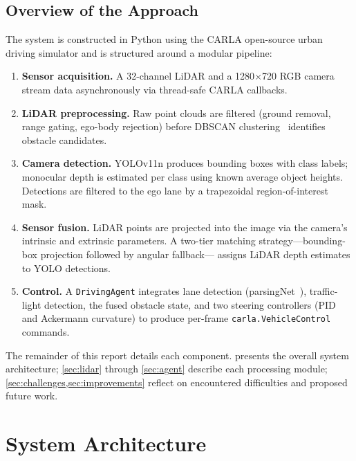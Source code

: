 \documentclass[12pt,a4paper]{article}
\begin{document}
\subsection{Overview of the Approach}

The system is constructed in Python using the CARLA open-source urban driving
simulator and is structured around a modular pipeline:
\begin{enumerate}[label=\textbf{\arabic*.}, leftmargin=2em]
  \item \textbf{Sensor acquisition.} A 32-channel LiDAR and a 1280$\times$720
        RGB camera stream data asynchronously via thread-safe CARLA callbacks.
  \item \textbf{LiDAR preprocessing.} Raw point clouds are filtered (ground
        removal, range gating, ego-body rejection) before DBSCAN
        clustering~\cite{ester1996dbscan} identifies obstacle candidates.
  \item \textbf{Camera detection.} YOLOv11n produces bounding boxes with class
        labels; monocular depth is estimated per class using known average
        object heights.  Detections are filtered to the ego lane by a
        trapezoidal region-of-interest mask.
  \item \textbf{Sensor fusion.} LiDAR points are projected into the image via
        the camera's intrinsic and extrinsic parameters.  A two-tier matching
        strategy---bounding-box projection followed by angular fallback---
        assigns LiDAR depth estimates to YOLO detections.
  \item \textbf{Control.} A \texttt{DrivingAgent} integrates lane detection
        (parsingNet~\cite{qin2020ufld}), traffic-light detection, the fused
        obstacle state, and two steering controllers (PID and Ackermann
        curvature) to produce per-frame \texttt{carla.VehicleControl} commands.
\end{enumerate}

The remainder of this report details each component.   presents
the overall system architecture; \cref{sec:lidar} through
\cref{sec:agent} describe each processing module;
\cref{sec:challenges,sec:improvements} reflect on encountered difficulties
and proposed future work.

\section{System Architecture}
\label{sec:arch}
\end{document}
